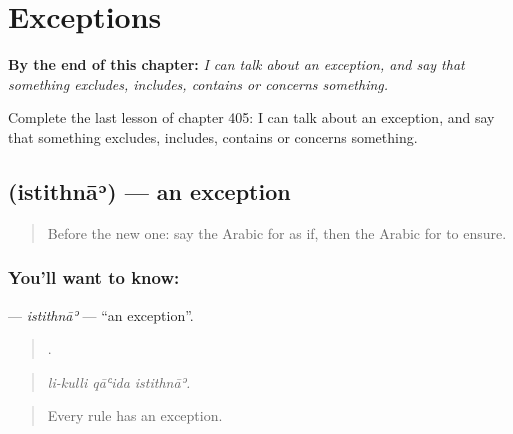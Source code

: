 
\chapter{Exceptions}
\label{ch:ar-exceptions}

\begin{chapteropening}
\textbf{By the end of this chapter:} \emph{I can talk about an exception, and say that something excludes, includes, contains or concerns something.}

Complete the last lesson of chapter 405: I can talk about an exception, and say that something excludes, includes, contains or concerns something.
\end{chapteropening}

\section[\texorpdfstring{\ar{استثناء} (istithnāʾ)}{استثناء (istithnāʾ)}]{ (istithnāʾ) — an exception}

\label{lesson:AR-C405-istithna}



\begin{quote}
Before the new one: say the Arabic for as if, then the Arabic for to ensure.
\end{quote}

\subsection*{You'll want to know: }
\textbf{} — \emph{istithnāʾ} — \textquotedblleft{}an exception\textquotedblright{}.

\begin{quote}
  .
\end{quote}

\begin{quote}
\emph{li-kulli qāʿida istithnāʾ.}
\end{quote}

\begin{quote}
Every rule has an exception.
\end{quote}

